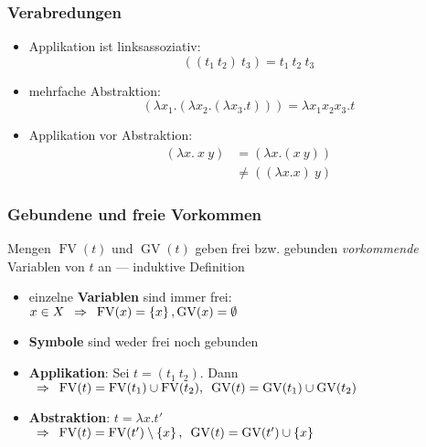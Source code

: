 \documentclass{beamer}
\DeclareMathOperator{\GV}{GV}
\DeclareMathOperator{\FV}{FV}
\begin{document}
\begin{frame} \frametitle{Verabredungen}
	\footnotesize
	\begin{itemize}[<+->]
		\item Applikation ist linksassoziativ:
		\begin{equation*}
			((t_1 \ t_2) \ t_3) = t_1 \ t_2 \ t_3 
		\end{equation*}
		\item mehrfache Abstraktion:
		\begin{equation*}
			(\lambda x_1 . (\lambda x_2 . (\lambda x_3 . t))) = \lambda x_1 x_2 x_3 . t 
		\end{equation*}
		\item Applikation vor Abstraktion:
		\begin{align*}
			(\lambda x . \ x \ y) &= (\lambda x . (x \ y)) \\
			&\neq ((\lambda x . x) \ y)
		\end{align*}
	\end{itemize}
\end{frame}

\begin{frame} \frametitle{Gebundene und freie Vorkommen}
	\footnotesize
	Mengen $\FV(t)$ und $\GV(t)$ geben frei bzw. gebunden \textit{vorkommende} Variablen von $t$ an --- induktive Definition
	
	\pause
	
	\begin{itemize}[<+->]
		\item einzelne \textbf{Variablen} sind immer frei: \\
		$x \in X \follows \FV(x) = \menge{x} , \GV(x) = \emptyset$
		\item \textbf{Symbole} sind weder frei noch gebunden
		\item \textbf{Applikation}: Sei $t = (t_1 \  t_2)$. Dann \\
		$\follows 
		\FV(t) = \FV(t_1) \cup \FV(t_2) , \enskip
		\GV(t) = \GV(t_1) \cup \GV(t_2)$
		\item \textbf{Abstraktion}: $t = \lambda x . t'$ \\
		$\follows 
		\FV(t) = \FV(t') \setminus \menge{x} , \enskip
		\GV(t) = \GV(t') \cup \menge{x}$
	\end{itemize}
\end{frame}
\end{document}
